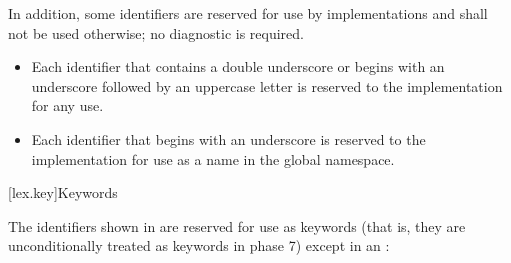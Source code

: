 \pnum
{}%
%
%
In addition, some identifiers are reserved for use by \Cpp{}
implementations and shall
not be used otherwise; no diagnostic is required.
\begin{itemize}
\item
Each identifier that contains a double underscore
\tcode{\unun}
%
or begins with an underscore followed by
an uppercase letter
%
is reserved to the implementation for any use.
\item
Each identifier that begins with an underscore is
%
reserved to the implementation for use as a name in the global namespace.%
\end{itemize}%

[lex.key]{Keywords}

\enlargethispage{\baselineskip}%
\pnum
{}%
The identifiers shown in  are reserved for use
as keywords (that is, they are unconditionally treated as keywords in
phase 7) except in an :

